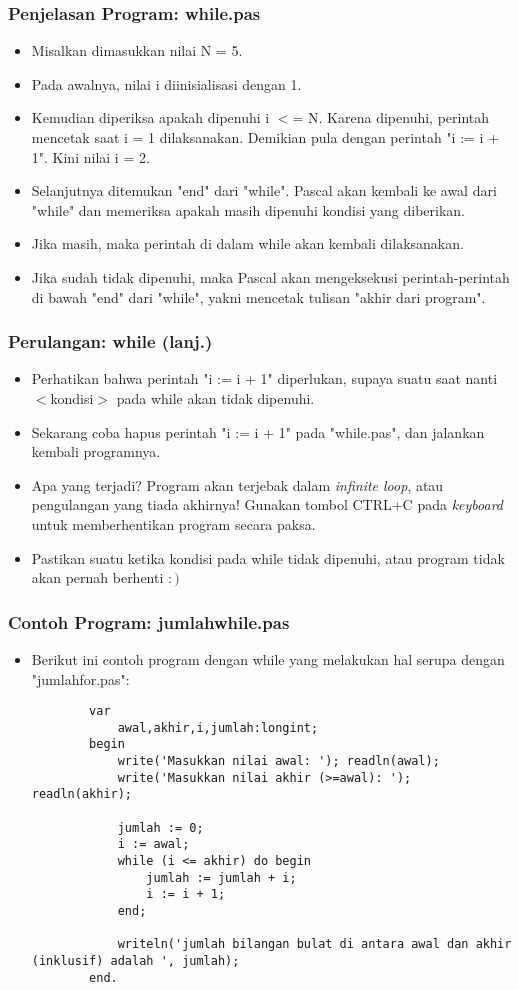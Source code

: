 \documentclass{beamer}
\begin{document}
\begin{frame}
\frametitle{Penjelasan Program: while.pas}
\begin{itemize}
	\item Misalkan dimasukkan nilai N = 5.
	\item Pada awalnya, nilai i diinisialisasi dengan 1.
	\item Kemudian diperiksa apakah dipenuhi i $<$= N. Karena dipenuhi, perintah mencetak saat i = 1 dilaksanakan. Demikian pula dengan perintah "i := i + 1". Kini nilai i = 2.
	\item Selanjutnya ditemukan "end" dari "while". Pascal akan kembali ke awal dari "while" dan memeriksa apakah masih dipenuhi kondisi yang diberikan.
	\item Jika masih, maka perintah di dalam while akan kembali dilaksanakan.
	\item Jika sudah tidak dipenuhi, maka Pascal akan mengeksekusi perintah-perintah di bawah "end" dari "while", yakni mencetak tulisan "akhir dari program".
\end{itemize}
\end{frame}

\begin{frame}
\frametitle{Perulangan: while (lanj.)}
\begin{itemize}
	\item Perhatikan bahwa perintah "i := i + 1" diperlukan, supaya suatu saat nanti $<$kondisi$>$ pada while akan tidak dipenuhi.
	\item Sekarang coba hapus perintah "i := i + 1" pada "while.pas", dan jalankan kembali programnya.
	\item Apa yang terjadi? Program akan terjebak dalam \alert{\textit{infinite loop}}, atau \alert{pengulangan yang tiada akhirnya}! Gunakan tombol CTRL+C pada \textit{keyboard} untuk memberhentikan program secara paksa.
	\item Pastikan suatu ketika kondisi pada while tidak dipenuhi, atau program tidak akan pernah berhenti $:)$
\end{itemize}
\end{frame}

\begin{frame}[fragile]
\frametitle{Contoh Program: jumlahwhile.pas}
\begin{itemize}
	\item Berikut ini contoh program dengan while yang melakukan hal serupa dengan "jumlahfor.pas":
	\begin{lstlisting}
		var
		    awal,akhir,i,jumlah:longint;
		begin
		    write('Masukkan nilai awal: '); readln(awal);
		    write('Masukkan nilai akhir (>=awal): '); readln(akhir);
		
		    jumlah := 0;
		    i := awal;
		    while (i <= akhir) do begin
		        jumlah := jumlah + i;
		        i := i + 1;
		    end;
		
		    writeln('jumlah bilangan bulat di antara awal dan akhir (inklusif) adalah ', jumlah);
		end.
	\end{lstlisting}
\end{itemize}
\end{frame}
\end{document}
